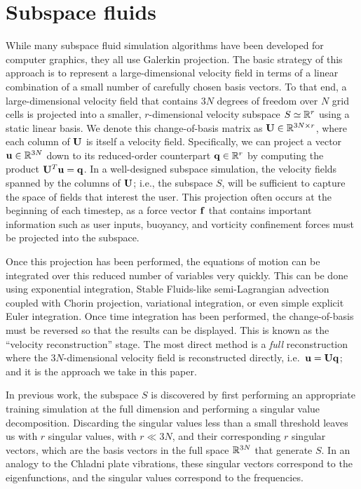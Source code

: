 \documentclass[11pt]{article}
\begin{document}
\section*{Subspace fluids}
While many subspace fluid simulation algorithms have been developed for computer graphics, they all use Galerkin projection. The basic strategy of this approach is to represent a large-dimensional velocity field in terms of a linear combination of a small number of carefully chosen basis vectors. To that end, a large-dimensional velocity field that contains $3N$ degrees of freedom over $N$ grid cells is projected into a smaller, $r$-dimensional velocity subspace $S \simeq \mathbb{R}^{r}$ using a static linear basis. We denote this change-of-basis matrix as $\mathbf{U} \in \mathbb{R}^{3N \times r}$, where each column of $\mathbf{U}$ is itself a velocity field. Specifically, we can project a vector $\mathbf{u} \in \mathbb{R}^{3N}$ down to its reduced-order counterpart $\mathbf{q} \in \mathbb{R}^r$ by computing the product $\mathbf{U}^T \mathbf{u} = \mathbf{q}$. In a well-designed subspace simulation, the velocity fields spanned by the columns of $\mathbf{U}$; i.e., the subspace $S$, will be sufficient to capture the space of fields that interest the user. This projection often occurs at the beginning of each timestep, as a force vector $\mathbf{f}$ that contains important information such as user inputs, buoyancy, and vorticity confinement forces must be projected into the subspace.

Once this projection has been performed, the equations of motion can be integrated over this reduced number of variables very quickly. This can be done using exponential integration, Stable Fluids-like semi-Lagrangian advection coupled with Chorin projection, variational integration, or even simple explicit Euler integration. Once time integration has been performed, the change-of-basis must be reversed so that the results can be displayed. This is known as the ``velocity reconstruction'' stage. The most direct method is a {\em full} reconstruction where the $3N$-dimensional velocity field is reconstructed directly, i.e.~$\mathbf{u} = \mathbf{U}\mathbf{q}$; and it is the approach we take in this paper.

In previous work, the subspace $S$ is discovered by first performing an appropriate training simulation at the full dimension and performing a singular value decomposition. Discarding the singular values less than a small threshold leaves us with $r$ singular values, with $r \ll 3N$, and their corresponding $r$ singular vectors, which are the basis vectors in the full space $\mathbb{R}^{3N}$ that generate $S$. In an analogy to the Chladni plate vibrations, these singular vectors correspond to the eigenfunctions, and the singular values correspond to the frequencies.
\end{document}
